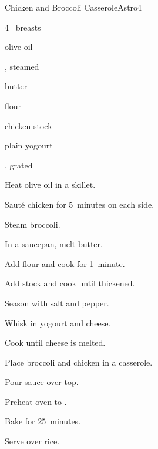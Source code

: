 \begin{recipe}{Chicken and Broccoli Casserole}{Astro}{4}

\begin{ingredients}
\item 4~ breasts
\item {} olive oil
\item {} , steamed 
\item {} butter
\item {} flour
\item \C{1\half} chicken stock
\item {} plain yogourt
\item \C{\half} , grated 
\end{ingredients}

\begin{directions}
\item Heat olive oil in a skillet.
\item Saut\'e chicken for 5~minutes on each side.
\item Steam broccoli.
\item In a saucepan, melt butter.
\item Add flour and cook for 1~minute.
\item Add stock and cook until thickened.
\item Season with salt and pepper.
\item Whisk in yogourt and cheese.
\item Cook until cheese is melted.
\item Place broccoli and chicken in a casserole.
\item Pour sauce over top.
\item Preheat oven to .
\item Bake for 25~minutes.
\item Serve over rice.
\end{directions}

\end{recipe}
